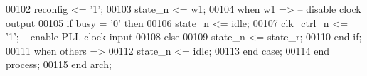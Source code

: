 \begin{DoxyCode}
00102                 \textcolor{vhdlchar}{reconfig} \textcolor{vhdlchar}{<=} \textcolor{vhdlchar}{'}\textcolor{vhdllogic}{}\textcolor{vhdllogic}{1}\textcolor{vhdlchar}{'};
00103                 \textcolor{vhdlchar}{state_n} \textcolor{vhdlchar}{<=} \textcolor{vhdlchar}{w1};
00104             \textcolor{keywordflow}{when} \textcolor{vhdlchar}{w1} \textcolor{vhdlchar}{=}\textcolor{vhdlchar}{>}\textcolor{keyword}{          -- disable clock output}
00105                 \textcolor{keywordflow}{if} \textcolor{vhdlchar}{busy} \textcolor{vhdlchar}{=} \textcolor{vhdlchar}{'}\textcolor{vhdllogic}{}\textcolor{vhdllogic}{0}\textcolor{vhdlchar}{'} \textcolor{keywordflow}{then}
00106                     \textcolor{vhdlchar}{state_n} \textcolor{vhdlchar}{<=} \textcolor{vhdlchar}{idle};
00107                     \textcolor{vhdlchar}{clk_ctrl_n} \textcolor{vhdlchar}{<=} \textcolor{vhdlchar}{'}\textcolor{vhdllogic}{}\textcolor{vhdllogic}{1}\textcolor{vhdlchar}{'};\textcolor{keyword}{      -- enable PLL clock input}
00108                 \textcolor{keywordflow}{else}
00109                     \textcolor{vhdlchar}{state_n} \textcolor{vhdlchar}{<=} \textcolor{vhdlchar}{state_r};
00110                 \textcolor{keywordflow}{end} \textcolor{keywordflow}{if};
00111             \textcolor{keywordflow}{when} \textcolor{keywordflow}{others} \textcolor{vhdlchar}{=}\textcolor{vhdlchar}{>} 
00112                 \textcolor{vhdlchar}{state_n} \textcolor{vhdlchar}{<=} \textcolor{vhdlchar}{idle};
00113         \textcolor{keywordflow}{end} \textcolor{keywordflow}{case};
00114     \textcolor{keywordflow}{end} \textcolor{keywordflow}{process};
00115 \textcolor{keywordflow}{end} \textcolor{vhdlchar}{arch};
\end{DoxyCode}
